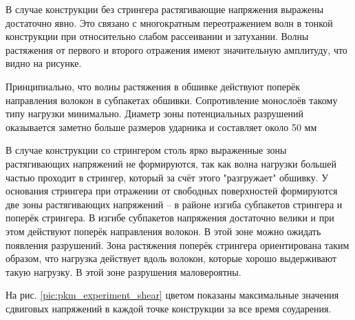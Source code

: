 В случае конструкции без стрингера растягивающие напряжения выражены достаточно явно. Это связано с многократным переотражением волн в тонкой конструкции при относительно слабом рассеивании и затухании. Волны растяжения от первого и второго отражения имеют значительную амплитуду, что видно на рисунке.

Принципиально, что волны растяжения в обшивке действуют поперёк направления волокон в субпакетах обшивки. Сопротивление монослоёв такому типу нагрузки минимально. Диаметр зоны потенциальных разрушений оказывается заметно больше размеров ударника и составляет около 50 мм

В случае конструкции со стрингером столь ярко выраженные зоны растягивающих напряжений не формируются, так как волна нагрузки большей частью проходит в стрингер, который за счёт этого "разгружает" обшивку. У основания стрингера при отражении от свободных поверхностей формируются две зоны растягивающих напряжений -- в районе изгиба субпакетов стрингера и поперёк стрингера. В изгибе субпакетов напряжения достаточно велики и при этом действуют поперёк направления волокон. В этой зоне можно ожидать появления разрушений. Зона растяжения поперёк стрингера ориентирована таким образом, что нагрузка действует вдоль волокон, которые хорошо выдерживают такую нагрузку. В этой зоне разрушения маловероятны.


\clearpage
\newpage


На рис. \ref{pic:pkm_experiment_shear} цветом показаны максимальные значения сдвиговых напряжений в каждой точке конструкции за все время соударения.

